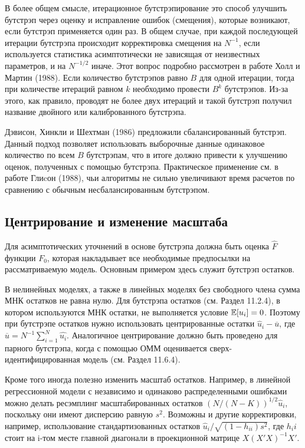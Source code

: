 В более общем смысле, итерационное бутстрэпирование это способ улучшить бутстрэп через оценку и исправление ошибок (смещения), которые возникают, если бутстрэп применяется один раз. В общем случае, при каждой последующей итерации бутстрэпа происходит корректировка смещения на $N^{-1}$, если используется статистика асимптотически не зависящая от неизвестных параметров, и на $N^{-1/2}$ иначе. Этот вопрос подробно рассмотрен в работе Холл и Мартин (1988). Если количество бутстрэпов равно $B$ для одной итерации, тогда при количестве итераций равном $k$ необходимо провести $B^k$ бутстрэпов. Из-за этого, как правило, проводят не более двух итераций и такой бутстрэп получил название двойного или калиброванного бутстрэпа.

Дэвисон, Хинкли и Шехтман (1986) предложили  сбалансированный бутстрэп. Данный подход позволяет использовать выборочные данные одинаковое количество по всем $B$ бутстрэпам, что в итоге должно привести к улучшению оценок, полученных с помощью бутстрэпа. Практическое применение см. в работе Глиcон (1988), чьи алгоритмы не сильно увеличивают время расчетов по сравнению с обычным несбалансированным бутстрэпом.

\subsection{Центрирование и изменение масштаба}

Для  асимптотических уточнений в основе бутстрэпа должна быть оценка $\hat{F}$ функции $F_0$, которая накладывает все необходимые предпосылки на рассматриваемую модель. Основным примером здесь служит бутстрэп остатков.

В нелинейных моделях, а также в линейных моделях без свободного члена сумма МНК остатков не равна нулю. Для бутстрэпа остатков (см. Раздел 11.2.4), в котором используются МНК остатки, не выполняется условие $\mathbb{E}[u_i]=0$. Поэтому при бутстрэпе остатков нужно использовать центрированные остатки $\hat{u}_i-\overline{u}$, где $\overline{u}=N^{-1}\sum_{i=1}^N\hat{u_i}$. Аналогичное центрирование должно быть проведено для парного бутстрэпа, когда с помощью ОММ оценивается сверх-идентифицированная модель (см. Раздел 11.6.4).

Кроме того иногда полезно изменить масштаб остатков. Например, в линейной регрессионной модели с независимо и одинаково распределенными ошибками можно делать ресэмплинг масштабированных остатков $(N/(N-K))^{1/2}\hat{u}_i$, поскольку они имеют дисперсию равную $s^2$. Возможны и другие корректировки, например, использование стандартизованных остатков $\hat{u}_i/\sqrt{(1-h_{ii})s^2}$, где $h_ii$ стоит на i-том месте главной диагонали в проекционной матрице $X(X'X)^{-1}X'$.

